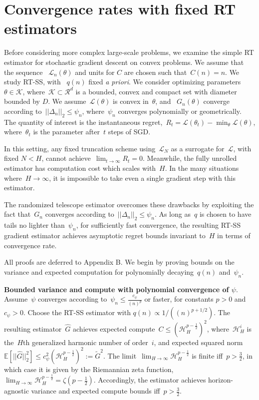 \section{Convergence rates with fixed RT estimators}
Before considering more complex large-scale problems, we examine the simple RT estimator for stochastic gradient descent on convex problems.
We assume that the sequence ~$\mathcal{L}_n(\theta)$ and units for $C$ are chosen such that~$C(n) = n$.
We study RT-SS, with ~$q(n)$ fixed \emph{a priori}.
We consider optimizing parameters~${\theta \in \mathcal{K}}$, where~${\mathcal{K} \subset \mathcal{R}^d}$ is a bounded, convex and compact set with diameter bounded by $D$.
We assume~$\mathcal{L}(\theta)$ is convex in~$\theta$, and ~$G_n(\theta)$ converge according to~${||\Delta_n||_2 \leq \psi_n}$, where~$\psi_n$ converges polynomially or geometrically.
The quantity of interest is the instantaneous regret,~${R_t = \mathcal{L}(\theta_t) - \min_{\theta} \mathcal{L} (\theta)}$, where~$\theta_t$ is the parameter after~$t$ steps of SGD.

In this setting, any fixed truncation scheme using~$\mathcal{L}_N$ as a surrogate for~$\mathcal{L}$, with fixed ${N < H}$, cannot achieve~${\lim_{t \to \infty} R_t = 0}$.
Meanwhile, the fully unrolled estimator has computation cost which scales with~$H$.
In the many situations where~${H \to \infty}$, it is impossible to take even a single gradient step with this estimator.

The randomized telescope estimator overcomes these drawbacks by exploiting the fact that~$G_n$ converges according to~$||\Delta_n||_2 \leq \psi_n$.
As long as~$q$ is chosen to have tails no lighter than~$\psi_n$, for sufficiently fast convergence, the resulting RT-SS gradient estimator achieves asymptotic regret bounds invariant to~$H$ in terms of convergence rate.

All proofs are deferred to Appendix B.
We begin by proving bounds on the variance and expected computation for polynomially decaying~$q(n)$ and~$\psi_n$.
\begin{theorem}\label{thm:poly}
\textbf{Bounded variance and compute with polynomial convergence of $\psi$}.
Assume~$\psi$ converges according to~$\psi_n \leq \frac{c_\psi}{(n)^p}$ or faster, for constants ${p > 0}$ and~$c_\psi > 0$.
Choose the RT-SS estimator with ${q(n) \propto 1/((n)^{p + 1/2})}$.
The resulting estimator~$\hat{G}$ achieves expected compute~${C \leq (\mathcal{H}_{H}^{p-\frac{1}{2}})^2}$, where~$\mathcal{H}_H^i$ is the~$H$th generalized harmonic number of order~$i$, and expected squared norm $\mathbb{E}[ ||\hat{G}||_2^2 ] \leq c_{\psi}^2 (\mathcal{H}_H^{p-\frac{1}{2}})^2 := \tilde{G}^2$.
The limit~${\lim_{H \to \infty} \mathcal{H}_H^{p - \frac{1}{2}}}$ is finite iff~${p > \frac{3}{2}}$, in which case it is given by the Riemannian zeta function,~${\lim_{H \to \infty} \mathcal{H}_H^{p - \frac{1}{2}} = \zeta(p - \frac{1}{2})}$.
Accordingly, the estimator achieves horizon-agnostic variance and expected compute bounds iff~${p > \frac{3}{2}}$.
\end{theorem}

